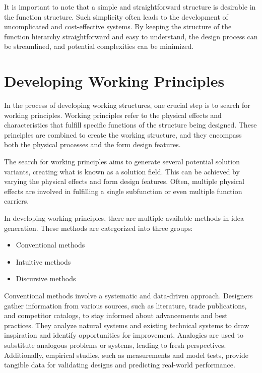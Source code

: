 It is important to note that a simple and straightforward structure is desirable in the function structure. Such simplicity often leads to the development of uncomplicated and cost-effective systems. By keeping the structure of the function hierarchy straightforward and easy to understand, the design process can be streamlined, and potential complexities can be minimized.

\section{Developing Working Principles}

In the process of developing working structures, one crucial step is to search for working principles. Working principles refer to the physical effects and characteristics that fulfill specific functions of the structure being designed. These principles are combined to create the working structure, and they encompass both the physical processes and the form design features.

The search for working principles aims to generate several potential solution variants, creating what is known as a solution field. This can be achieved by varying the physical effects and form design features. Often, multiple physical effects are involved in fulfilling a single subfunction or even multiple function carriers. \cite{Pahl07f}

In developing working principles, there are multiple available methods in idea generation. These methods are categorized into three groups:

\begin{itemize}
    \item Conventional methods
    \item Intuitive methods
    \item Discursive methods
\end{itemize}

Conventional methods involve a systematic and data-driven approach. Designers gather information from various sources, such as literature, trade publications, and competitor catalogs, to stay informed about advancements and best practices. They analyze natural systems and existing technical systems to draw inspiration and identify opportunities for improvement. Analogies are used to substitute analogous problems or systems, leading to fresh perspectives. Additionally, empirical studies, such as measurements and model tests, provide tangible data for validating designs and predicting real-world performance. \cite{Pahl07g}

